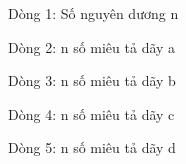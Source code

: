 Dòng 1: Số nguyên dương n  

   Dòng 2: n số miêu tả dãy a  

   Dòng 3: n số miêu tả dãy b  

   Dòng 4: n số miêu tả dãy c  

   Dòng 5: n số miêu tả dãy d  

\